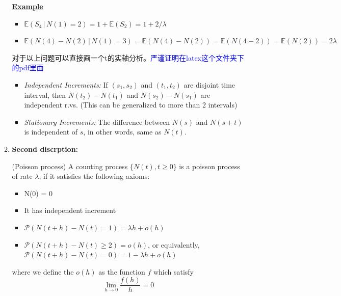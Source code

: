 \documentclass[10.5pt]{article}
\newcommand{\prob}[0]{\mathcal{P}}
\newcommand{\expt}[0]{\mathbb{E}}
\newenvironment{changemargin}[2]{%
  \begin{list}{}{%
    \setlength{\topsep}{0pt}%
    \setlength{\leftmargin}{#1}%
    \setlength{\rightmargin}{#2}%
    \setlength{\listparindent}{\parindent}%
    \setlength{\itemindent}{\parindent}%
    \setlength{\parsep}{\parskip}%
  }%
  \item[]}{\end{list}}
\begin{document}
\begin{changemargin}{-0.125in}{0in}
\begin{enumerate}
\begin{enumerate}
                   \underline{\textbf{Example}}
                   
                   \smallskip
                   
                   \begin{itemize}
                   	\item $\expt(S_4\,|\,N(1) = 2) = 1 + \expt (S_2) = 1 + 2/\lambda$
                   	\item $\expt(N(4) - N(2)\,|\,N(1) = 3) = \expt (N(4) - N(2)) = \expt(N(4-2)) = \expt(N(2)) = 2 \lambda$
                   \end{itemize}
                   对于以上问题可以直接画一个t的实轴分析。\textcolor{blue}{严谨证明在latex这个文件夹下的pdf里面}
                   \begin{proposition}
                   	\begin{itemize}
                   		\item \textit{Independent Increments:} If $(s_1, s_2)$ and $(t_1, t_2)$ are disjoint time interval, then $N(t_2) - N(t_1)$ and $N(s_2) - N(s_1)$ are independent r.vs. (This can be generalized to more than 2 intervals)
                   		\item \textit{Stationary Increments:} The difference between $N(s)$ and $N(s +t)$ is independent of $s$, in other words, same as $N(t)$. 
                   	\end{itemize}
                   \end{proposition}
                   
                   
                   \medskip
                   
                   \item \textbf{Second discrption:}
                   
                   \smallskip
                   
                   \begin{definition}
                   	(Poisson process) A counting process $\{N(t), t \geq 0\}$ is a poisson process of rate $\lambda$, if it satisfies the following axioms:
                   	\begin{itemize}
                   		\item N(0) = 0
                   		\item It has independent increment 
                   		\item $\prob(N(t + h) - N(t) = 1) = \lambda h + o(h)$
                   		\item $\prob (N(t + h)  - N(t) \geq 2) = o(h)$, or equivalently, $\prob(N(t + h) - N(t) = 0) = 1 - \lambda h + o(h)$  
                   	\end{itemize}
                   	where we define the $o(h)$ as the function $f$ which satisfy 
                   	\[
                   	\lim_{h \rightarrow 0} \frac{f(h)}{h} = 0 
                   	\]
                   \end{definition}
                   

\end{enumerate}
\end{enumerate}
\end{changemargin}
\end{document}

